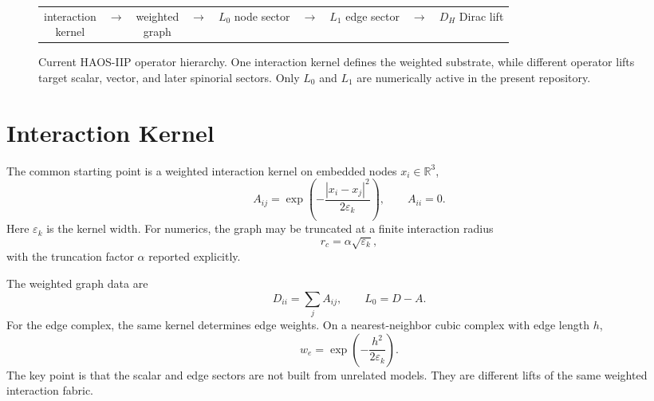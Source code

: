 \documentclass[11pt]{article}
\begin{document}
\begin{figure}[t]
\centering
\small
\setlength{\fboxsep}{6pt}
\renewcommand{\arraystretch}{1.1}
\begin{tabular}{c c c c c c c c c}
\fbox{\parbox{0.105\linewidth}{\centering interaction\\kernel}} &
$\to$ &
\fbox{\parbox{0.105\linewidth}{\centering weighted\\graph}} &
$\to$ &
\fbox{\parbox{0.105\linewidth}{\centering $L_0$\\node sector}} &
$\to$ &
\fbox{\parbox{0.105\linewidth}{\centering $L_1$\\edge sector}} &
$\to$ &
\fbox{\parbox{0.105\linewidth}{\centering $D_H$\\Dirac lift}}
\end{tabular}
\caption{Current HAOS-IIP operator hierarchy. One interaction kernel defines the weighted substrate, while different operator lifts target scalar, vector, and later spinorial sectors. Only $L_0$ and $L_1$ are numerically active in the present repository.}
\label{fig:operator-hierarchy}
\end{figure}

\section{Interaction Kernel}
The common starting point is a weighted interaction kernel on embedded nodes $x_i \in \mathbb{R}^3$,
\begin{equation}
A_{ij} = \exp\!\left(-\frac{|x_i-x_j|^2}{2\varepsilon_k}\right),
\qquad
A_{ii}=0.
\end{equation}
Here $\varepsilon_k$ is the kernel width. For numerics, the graph may be truncated at a finite interaction radius
\begin{equation}
r_c = \alpha \sqrt{\varepsilon_k},
\end{equation}
with the truncation factor $\alpha$ reported explicitly.

The weighted graph data are
\begin{equation}
D_{ii} = \sum_j A_{ij},
\qquad
L_0 = D - A.
\end{equation}
For the edge complex, the same kernel determines edge weights. On a nearest-neighbor cubic complex with edge length $h$,
\begin{equation}
w_e = \exp\!\left(-\frac{h^2}{2\varepsilon_k}\right).
\end{equation}
The key point is that the scalar and edge sectors are not built from unrelated models. They are different lifts of the same weighted interaction fabric.
\end{document}
